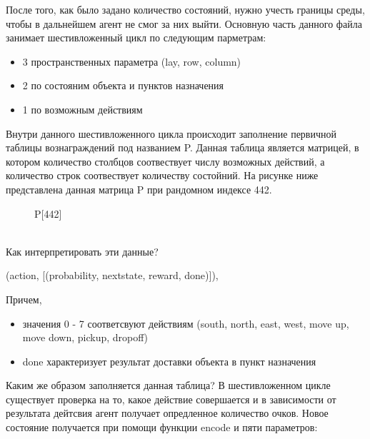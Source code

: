 \documentclass[12pt, a4paper]{report}
\theoremstyle{definition}
\theoremstyle{plain}
\theoremstyle{remark}
\theoremstyle{remark}
\theoremstyle{definition}
\begin{document}
После того, как было задано количество состояний, нужно учесть границы среды, чтобы в дальнейшем агент не смог за них выйти. Основную часть данного файла занимает шестивложенный цикл по следующим парметрам:
\begin{itemize}
    \item 3 пространственных параметра (lay, row, column)
    \item 2 по состояним объекта и пунктов назначения
    \item 1 по возможным действиям 
\end{itemize}
Внутри данного шестивложенного цикла происходит заполнение первичной таблицы вознаграждений под названием P. Данная таблица является матрицей, в котором количество столбцов соотвествует числу возможных действий, а количество строк соотвествует количеству состойний. На рисунке ниже представлена данная матрица P при рандомном индексе 442.
\begin{figure}[h!]
	\caption{P[442]}
\end{figure}
\\
Как интерпретировать эти данные?
\begin{center}
    (action, [(probability, nextstate, reward, done)]),
\end{center}
Причем, 
\begin{itemize}
    \item значения 0 - 7 соответсвуют действиям (south, north, east, west, move up, move down, pickup, dropoff)
    \item done характеризует результат доставки объекта в пункт назначения
\end{itemize}
Каким же образом заполняется данная таблица? В шестивложенном цикле существует проверка на то, какое действие совершается и в зависимости от результата дейтсвия агент получает опредленное количество очков. Новое состояние получается при помощи функции encode и пяти параметров:
\end{document}
